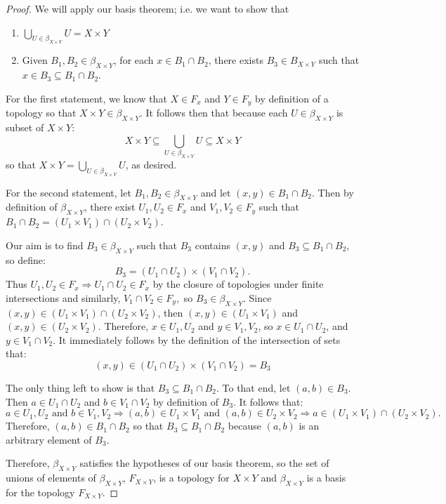 \begin{proof}
	We will apply our basis theorem; i.e. we want to show that 
	\begin{enumerate}
		\item $\bigcup_{U\in \beta_{X\times Y}} U = X \times Y$ 
		\item Given $B_1,B_2\in\beta_{X\times Y}$, for each $x\in B_1\cap B_2$, there exists $B_3\in B_{X\times Y}$ such that $x\in B_3\subseteq B_1\cap B_2$. 
	\end{enumerate}
	
	For the first statement, we know that $X\in F_x$ and $Y\in F_y$ by definition of a topology so that $X\times Y\in \beta_{X\times Y}$. It follows then that because each $U\in \beta_{X\times Y}$ is subset of $X\times Y$:
	\[X \times Y \subseteq \bigcup_{U\in \beta_{X\times Y}} U \subseteq X\times Y\]
	so that $X\times Y = \bigcup_{U\in \beta_{X\times Y}} U$, as desired.
	
	For the second statement, let $B_1,B_2\in \beta_{X\times Y}$ and let $(x,y)\in B_1\cap B_2$. Then by definition of $\beta_{X\times Y}$, there exist $U_1,U_2\in F_x$ and $V_1,V_2\in F_y$ such that $B_1\cap B_2 = (U_1\times V_1)\cap (U_2\times V_2)$. 
	
	Our aim is to find $B_3\in \beta_{X\times Y}$ such that $B_3$ contains $(x,y)$ and $B_3\subseteq B_1\cap B_2$, so define:
	\[B_3 = (U_1\cap U_2) \times (V_1\cap V_2).\]
	Thus $U_1,U_2\in F_x\Rightarrow U_1\cap U_2\in F_x$ by the closure of topologies under finite intersections and similarly, $V_1\cap V_2\in F_y,$ so $B_3\in \beta_{X\times Y}$. Since $(x,y)\in (U_1 \times V_1)\cap (U_2\times V_2)$, then $(x,y)\in (U_1\times V_1)$ and $(x,y)\in (U_2\times V_2)$. Therefore, $x\in U_1,U_2$ and $y\in V_1,V_2$, so $x\in U_1\cap U_2$, and $y\in V_1\cap V_2$. It immediately follows by the definition of the intersection of sets that:
	\[(x,y) \in (U_1\cap U_2)\times (V_1\cap V_2) = B_3\]
	
	The only thing left to show is that $B_3\subseteq B_1\cap B_2$. To that end, let $(a,b)\in B_3$. Then $a\in U_1\cap U_2$ and $b\in V_1\cap V_2$ by definition of $B_3$. It follows that:
	\[a\in U_1,U_2 \text{ and } b\in V_1,V_2 \Rightarrow (a,b)\in U_1\times V_1 \text{ and } (a,b)\in U_2 \times V_2 \Rightarrow a\in (U_1\times V_1)\cap (U_2\times V_2).\]
	Therefore, $(a,b)\in B_1\cap B_2$ so that $B_3\subseteq B_1\cap B_2$ because $(a,b)$ is an arbitrary element of $B_3$. 
	
	Therefore, $\beta_{X\times Y}$ satisfies the hypotheses of our basis theorem, so the set of unions of elements of $\beta_{X\times Y}$, $F_{X\times Y}$, is a topology for $X\times Y$ and $\beta_{X\times Y}$ is a basis for the topology $F_{X\times Y}$. 
\end{proof}

